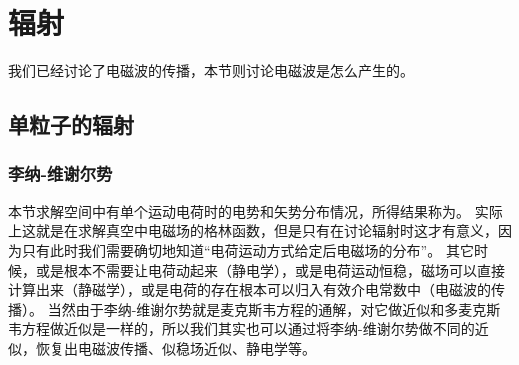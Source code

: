 \chapter{辐射}\label{chap:radiation}

我们已经讨论了电磁波的传播，本节则讨论电磁波是怎么产生的。

\section{单粒子的辐射}

\subsection{李纳-维谢尔势}

本节求解空间中有单个运动电荷时的电势和矢势分布情况，所得结果称为。
实际上这就是在求解真空中电磁场的格林函数，但是只有在讨论辐射时这才有意义，因为只有此时我们需要确切地知道“电荷运动方式给定后电磁场的分布”。
其它时候，或是根本不需要让电荷动起来（静电学），或是电荷运动恒稳，磁场可以直接计算出来（静磁学），或是电荷的存在根本可以归入有效介电常数中（电磁波的传播）。
当然由于李纳-维谢尔势就是麦克斯韦方程的通解，对它做近似和多麦克斯韦方程做近似是一样的，所以我们其实也可以通过将李纳-维谢尔势做不同的近似，恢复出电磁波传播、似稳场近似、静电学等。

